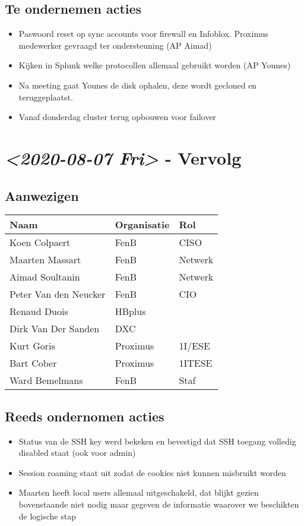 \documentclass[11pt]{article}
\begin{document}
\subsection{Te ondernemen acties}
\label{sec:orgf3e3a80}
\begin{itemize}
\item Paswoord reset op sync accounts voor firewall en Infoblox. Proximus medewerker gevraagd ter ondersteuning (AP Aimad)
\item Kijken in Splunk welke protocollen allemaal gebruikt worden (AP Younes)
\item Na meeting gaat Younes de disk ophalen, deze wordt gecloned en teruggeplaatst.
\item Vanaf donderdag cluster terug opbouwen voor failover
\end{itemize}


\section{\textit{<2020-08-07 Fri> } - Vervolg}
\label{sec:org8b7a1c7}

\subsection{Aanwezigen}
\label{sec:org3aa4b31}

\begin{center}
\begin{tabular}{lll}
Naam & Organisatie & Rol\\
\hline
Koen Colpaert & FenB & CISO\\
Maarten Massart & FenB & Netwerk\\
Aimad Soultanin & FenB & Netwerk\\
Peter Van den Neucker & FenB & CIO\\
Renaud Duois & HBplus & \\
Dirk Van Der Sanden & DXC & \\
Kurt Goris & Proximus & 1I/ESE\\
Bart Cober & Proximus & 1ITESE\\
Ward Bemelmans & FenB & Staf\\
\end{tabular}
\end{center}

\subsection{Reeds ondernomen acties}
\label{sec:org5af83be}
\begin{itemize}
\item Status van de SSH key werd bekeken en bevestigd dat SSH toegang volledig disabled staat (ook voor admin)
\item Session roaming staat uit zodat de cookies niet kunnen misbruikt worden
\item Maarten heeft local users allemaal uitgeschakeld, dat blijkt gezien bovenstaande niet nodig maar gegeven de informatie waarover we beschikten de logische stap
\end{itemize}
\end{document}
